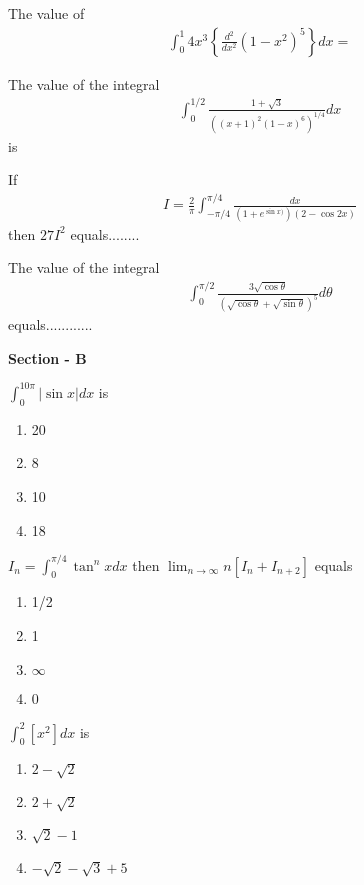 \item The value of 
\begin{align*}
\int_{0}^{1}4x^3\left\lbrace\frac{d^2}{dx^2}(1 - x^2)^5\right\rbrace dx = 
\end{align*}

\item The value of the integral
\begin{align*}
\int_{0}^{1/2}\frac{1 + \sqrt{3}}{((x + 1)^2(1 - x)^6)^{1/4}}dx
\end{align*}
is

\item If 
\begin{align*}
I = \frac{2}{\pi}\int_{-\pi/4}^{\pi/4}\frac{dx}{(1 + e^{\sin x)})(2 - \cos 2x)} 
\end{align*}
then $27I^{2}$ equals........

\item The value of the integral
\begin{align*}
\int_{0}^{\pi/2}\frac{3\sqrt{\cos \theta}}{\left(\sqrt{\cos \theta} + \sqrt{\sin \theta}\right)^{5}}d\theta
\end{align*}
equals............

\textbf{Section - B}

\item $\int_{0}^{10\pi}|\sin x|dx$ is
\begin{enumerate}
\item 20
\item 8
\item 10
\item 18
\end{enumerate}

\item $I_n = \int_{0}^{\pi/4}\tan^{n}x dx$ then $\lim_{n \to \infty}n[I_n + I_{n + 2}]$ equals
\begin{enumerate}
\item 1/2
\item 1
\item $\infty$
\item 0
\end{enumerate}

\item $\int_{0}^{2}[x^2]dx$ is
\begin{enumerate}
\item $2 - \sqrt{2}$
\item $2 + \sqrt{2}$
\item $\sqrt{2} - 1$
\item $-\sqrt{2} - \sqrt{3} + 5$
\end{enumerate}

